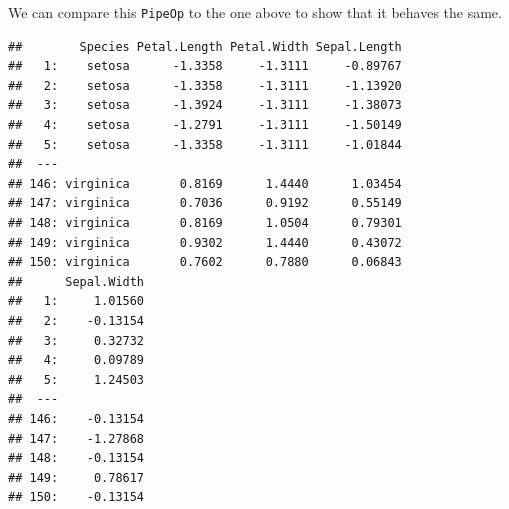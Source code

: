 \documentclass[]{article}
\newenvironment{Shaded}{\begin{snugshade}}{\end{snugshade}}
\newcommand{\DecValTok}[1]{\textcolor[rgb]{0.00,0.00,0.81}{#1}}
\newcommand{\KeywordTok}[1]{\textcolor[rgb]{0.13,0.29,0.53}{\textbf{#1}}}
\newcommand{\NormalTok}[1]{#1}
\newcommand{\OperatorTok}[1]{\textcolor[rgb]{0.81,0.36,0.00}{\textbf{#1}}}
\newcommand{\StringTok}[1]{\textcolor[rgb]{0.31,0.60,0.02}{#1}}
\renewenvironment{Shaded} {\begin{snugshade}\small} {\end{snugshade}}
\begin{document}
We can compare this \texttt{PipeOp} to the one above to show that it behaves the same.

\begin{Shaded}
\end{Shaded}

\begin{Shaded}
\end{Shaded}

\begin{verbatim}
##        Species Petal.Length Petal.Width Sepal.Length
##   1:    setosa      -1.3358     -1.3111     -0.89767
##   2:    setosa      -1.3358     -1.3111     -1.13920
##   3:    setosa      -1.3924     -1.3111     -1.38073
##   4:    setosa      -1.2791     -1.3111     -1.50149
##   5:    setosa      -1.3358     -1.3111     -1.01844
##  ---                                                
## 146: virginica       0.8169      1.4440      1.03454
## 147: virginica       0.7036      0.9192      0.55149
## 148: virginica       0.8169      1.0504      0.79301
## 149: virginica       0.9302      1.4440      0.43072
## 150: virginica       0.7602      0.7880      0.06843
##      Sepal.Width
##   1:     1.01560
##   2:    -0.13154
##   3:     0.32732
##   4:     0.09789
##   5:     1.24503
##  ---            
## 146:    -0.13154
## 147:    -1.27868
## 148:    -0.13154
## 149:     0.78617
## 150:    -0.13154
\end{verbatim}

\begin{Shaded}
\end{Shaded}
\end{document}
